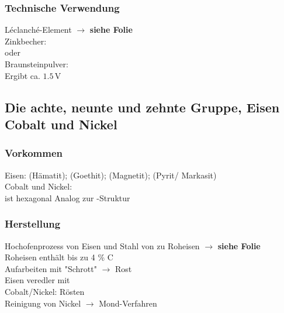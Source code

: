 \documentclass{article}
\begin{document}
\subsubsection{Technische Verwendung}
Léclanché-Element $\rightarrow$ \textbf{siehe Folie}\\
Zinkbecher: \\
oder \\
Braunsteinpulver: \\
Ergibt ca. $1.5\,\mathrm{V}$

\subsection{Die achte, neunte und zehnte Gruppe, Eisen Cobalt und Nickel}
\subsubsection{Vorkommen}
Eisen:  (Hämatit);  (Goethit);  (Magnetit);  (Pyrit/ Markasit)\\
Cobalt und Nickel: \\
 ist hexagonal Analog zur -Struktur\\

\subsubsection{Herstellung}
Hochofenprozess von Eisen und Stahl von  zu Roheisen $\rightarrow$ \textbf{siehe Folie}\\
Roheisen enthält bis zu 4 \% C\\
Aufarbeiten mit "Schrott" $\rightarrow$ Rost \\
Eisen veredler mit \\
Cobalt/Nickel: Rösten\\
Reinigung von Nickel $\rightarrow$ Mond-Verfahren\\
\end{document}
